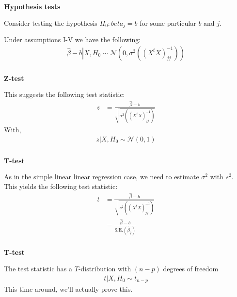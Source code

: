 \begin{frame}[fragile] \frametitle{}

{\bf Hypothesis tests}

Consider testing the hypothesis $H_0: beta_j = b$ for
some particular $b$ and $j$.

\pause Under assumptions I-V we have the following:
\begin{align*}
\left. \widehat{\beta} - b \right| X, H_0 \sim \mathcal{N} ( 0, \sigma^2 \left( (X^t X)^{-1}_{jj} \right))
\end{align*}

\end{frame}


\begin{frame}[fragile] \frametitle{}

{\bf Z-test}

This suggests the following test statistic:
\begin{align*}
z &= \frac{\widehat{\beta} - b}{\sqrt{\sigma^2  \left( (X^t X)^{-1}_{jj} \right)}}
\end{align*}
With,
\begin{align*}
\left. z \right| X, H_0 \sim \mathcal{N} (0, 1)
\end{align*}

\end{frame}

\begin{frame}[fragile] \frametitle{}

{\bf T-test}

As in the simple linear linear regression case, we need to estimate
$\sigma^2$ with $s^2$. This yields the following test statistic:
\begin{align*}
t &= \frac{\widehat{\beta} - b}{\sqrt{s^2  \left( (X^t X)^{-1}_{jj} \right)}} \\
&= \frac{\widehat{\beta} - b}{\text{S.E.}(\widehat{\beta}_j)}
\end{align*}


\end{frame}

\begin{frame}[fragile] \frametitle{}

{\bf T-test}

The test statistic has a $T$-distribution  with $(n-p)$ degrees
of freedom
\begin{align*}
\left. t \right| X, H_0 \sim t_{n-p}
\end{align*}
\pause This time around, we'll actually prove this.

\end{frame}

